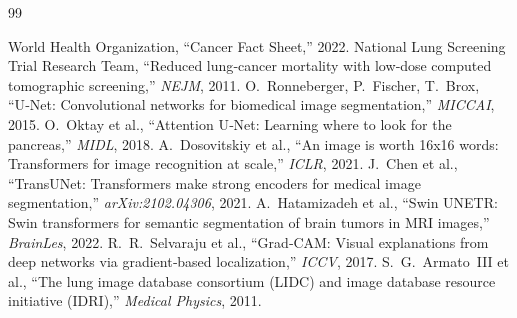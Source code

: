 \documentclass[conference]{IEEEtran}
\begin{document}
\begin{thebibliography}{99}

 World Health Organization, ``Cancer Fact Sheet,'' 2022.
 National Lung Screening Trial Research Team, ``Reduced lung‑cancer mortality with low‑dose computed tomographic screening,'' \textit{NEJM}, 2011.
 O.~Ronneberger, P.~Fischer, T.~Brox, ``U‑Net: Convolutional networks for biomedical image segmentation,'' \textit{MICCAI}, 2015.
 O.~Oktay et al., ``Attention U‑Net: Learning where to look for the pancreas,'' \textit{MIDL}, 2018.
 A.~Dosovitskiy et al., ``An image is worth 16x16 words: Transformers for image recognition at scale,'' \textit{ICLR}, 2021.
 J.~Chen et al., ``TransUNet: Transformers make strong encoders for medical image segmentation,'' \textit{arXiv:2102.04306}, 2021.
 A.~Hatamizadeh et al., ``Swin UNETR: Swin transformers for semantic segmentation of brain tumors in MRI images,'' \textit{BrainLes}, 2022.
 R.~R.~Selvaraju et al., ``Grad‑CAM: Visual explanations from deep networks via gradient‑based localization,'' \textit{ICCV}, 2017.
 S.~G.~Armato~III et al., ``The lung image database consortium (LIDC) and image database resource initiative (IDRI),'' \textit{Medical Physics}, 2011.

\end{thebibliography}
\end{document}
